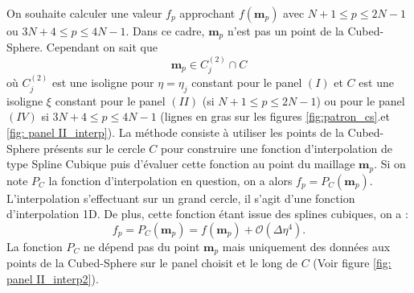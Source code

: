 On souhaite calculer une valeur $f_p$ approchant $f(\mathbf{m}_p)$ avec $N+1 \leq p \leq 2N-1$ ou $3N+4 \leq p \leq 4N-1$. Dans ce cadre, $\mathbf{m}_p$ n'est pas un point de la Cubed-Sphere. Cependant on sait que 
\begin{equation}
\mathbf{m}_p \in C^{(2)}_j \cap C
\end{equation} 
où $C^{(2)}_j$ est une isoligne pour $\eta = \eta_j$ constant pour le panel $(I)$ et $C$ est une isoligne $\xi$ constant pour le panel $(II)$ (si $N+1 \leq p \leq 2N-1$) ou pour le panel $(IV)$ si $3N+4 \leq p \leq 4N-1$ (lignes en gras sur les figures \ref{fig:patron_cs}.et \ref{fig: panel II_interp}).
La méthode consiste à utiliser les points de la Cubed-Sphere présents sur le cercle $C$ pour construire une fonction d'interpolation de type Spline Cubique puis d'évaluer cette fonction au point du maillage $\mathbf{m}_p$. Si on note $P_C$ la fonction d'interpolation en question, on a alors $f_p = P_C (\mathbf{m}_p)$. L'interpolation s'effectuant sur un grand cercle, il s'agit d'une fonction d'interpolation 1D. De plus, cette fonction étant issue des splines cubiques, on a :
\begin{equation}
f_p = P_C(\mathbf{m}_p) = f(\mathbf{m}_p) + \mathcal{O}(\Delta \eta^4).
\end{equation}
La fonction $P_C$ ne dépend pas du point $\mathbf{m}_p$ mais uniquement des données aux points de la Cubed-Sphere sur le panel choisit et le long de $C$ (Voir figure \ref{fig: panel II_interp2}).

